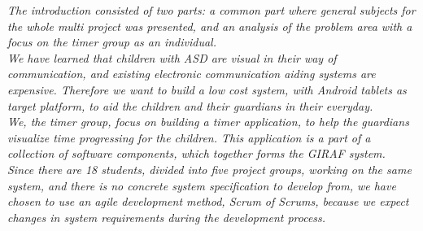 \textit{The introduction consisted of two parts: a common part where general subjects for the whole multi project was presented, and an analysis of the problem area with a focus on the timer group as an individual.}\\

\textit{We have learned that children with ASD are visual in their way of communication, and existing electronic communication aiding systems are expensive.
Therefore we want to build a low cost system, with Android tablets as target platform, to aid the children and their guardians in their everyday.}\\

\textit{We, the timer group, focus on building a timer application, to help the guardians visualize time progressing for the children.
This application is a part of a collection of software components, which together forms the GIRAF system.}\\

\textit{Since there are 18 students, divided into five project groups, working on the same system, and there is no concrete system specification to develop from, we have chosen to use an agile development method, Scrum of Scrums, because we expect changes in system requirements during the development process.}
